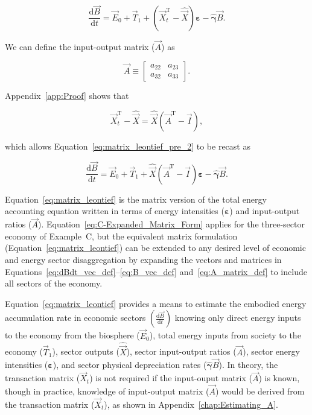 \begin{equation} \label{eq:matrix_leontief_pre_2}
	\frac{\mathrm{d}\vec{B}}{\mathrm{d}t} 
	= \vec{E}_{0}
	+ \vec{T}_{1}
	+ (\vec{X}_{t}^{\mathrm{T}} - \hat{\vec{X}})\bm{\varepsilon} 
	- \hat{\bm{\gamma}}\vec{B}.
\end{equation}

\noindent{}We can define the input-output matrix ($\vec{A}$) as

\begin{equation} \label{eq:A_matrix_def}
	\vec{A} 
	\equiv
	\begin{bmatrix}
		a_{22} & a_{23}	\\
		a_{32} & a_{33}	
	\end{bmatrix}.
\end{equation} 

\noindent{}Appendix~\ref{app:Proof} shows that

\begin{equation} \label{eq:Xdifference1}
	\vec{X}_{t}^{\mathrm{T}} 
	- \hat{\vec{X}} 
	= \hat{\vec{X}} (\vec{A}^{\mathrm{T}} - \vec{I}),
\end{equation}

\noindent{}which allows Equation~\ref{eq:matrix_leontief_pre_2}
to be recast as

\begin{equation} \label{eq:matrix_leontief}
	\frac{\mathrm{d}\vec{B}}{\mathrm{d}t} 
	= \vec{E}_{0}
	+ \vec{T}_{1}
	+ \hat{\vec{X}} (\vec{A}^{\mathrm{T}} - \vec{I})\bm{\varepsilon} 
	- \hat{\bm{\gamma}}\vec{B}.
\end{equation}

\noindent{}Equation~\ref{eq:matrix_leontief} is the matrix version 
of the total energy accounting equation
written in terms of energy intensities ($\bm{\varepsilon}$)
and input-output ratios ($\vec{A}$).
Equation~\ref{eq:C-Expanded_Matrix_Form} applies 
for the three-sector economy of Example~C, 
but the equivalent matrix formulation (Equation~\ref{eq:matrix_leontief}) 
can be extended to any desired level 
of economic and energy sector disaggregation 
by expanding the vectors and matrices in 
Equations~\ref{eq:dBdt_vec_def}--\ref{eq:B_vec_def}
and~\ref{eq:A_matrix_def} to include
all sectors of the economy.~\cite{Casler1984,Bullard:1978vd}

Equation~\ref{eq:matrix_leontief} provides a means to 
estimate the embodied energy accumulation rate
in economic sectors $\left(\frac{\mathrm{d}\vec{B}}{\mathrm{d}t}\right)$ 
knowing only 
direct energy inputs to the economy from the biosphere ($\vec{E}_{0}$), 
total energy inputs from society to the economy ($\vec{T}_{1}$),
sector outputs ($\hat{\vec{X}}$), 
sector input-output ratios ($\vec{A}$), 
sector energy intensities ($\bm{\varepsilon}$), 
and sector physical depreciation rates ($\hat{\bm{\gamma}}\vec{B}$). 
In theory, the transaction matrix ($\vec{X}_{t}$) is not required 
if the input-ouput matrix ($\vec{A}$) is known, 
though in practice, 
knowledge of input-output matrix ($\vec{A}$) 
would be derived from the transaction matrix ($\vec{X}_{t}$),
as shown in Appendix~\ref{chap:Estimating_A}.



